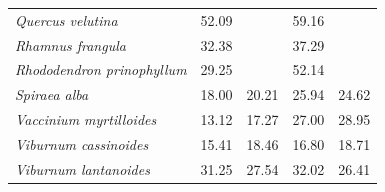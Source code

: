 \documentclass{article}
\begin{document}
\begin{table}[ht]
\begin{tabular}{lrrrr}
  \textit{Quercus velutina} & 52.09 &  & 59.16 &  \\ 
  \textit{Rhamnus frangula} & 32.38 &  & 37.29 &  \\ 
  \textit{Rhododendron prinophyllum} & 29.25 &  & 52.14 &  \\ 
  \textit{Spiraea alba} & 18.00 & 20.21 & 25.94 & 24.62 \\ 
  \textit{Vaccinium myrtilloides} & 13.12 & 17.27 & 27.00 & 28.95 \\ 
  \textit{Viburnum cassinoides} & 15.41 & 18.46 & 16.80 & 18.71 \\ 
  \textit{Viburnum lantanoides} & 31.25 & 27.54 & 32.02 & 26.41 \\ 
   \hline
\end{tabular}
\end{table}
\newpage
\end{document}
